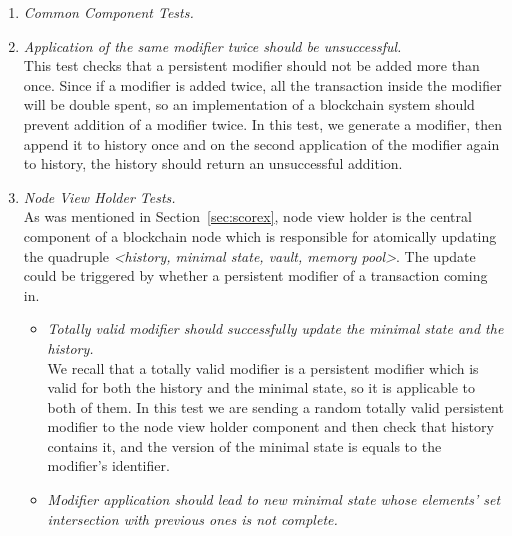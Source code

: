 \begin{enumerate}[\IEEEsetlabelwidth{Z}]
\item \textit{Common Component Tests.}\\

\item \textit{Application of the same modifier twice should be unsuccessful.}\\

This test checks that a persistent modifier should not be added more than once. Since if a modifier is added twice, all the transaction inside the modifier will be double spent, so an implementation of a blockchain system should prevent addition of a modifier twice. In this test, we generate a modifier, then append it to history once and on the second application of the modifier again to history, the history should return an unsuccessful addition.


\item \textit{Node View Holder Tests.}\\

As was mentioned in Section~\ref{sec:scorex}, node view holder is the central component of a blockchain node which is responsible for atomically updating the quadruple \textit{<history, minimal state, vault, memory pool>}. The update could be triggered by whether a persistent modifier of a transaction coming in. 


\begin{itemize}[]

\item \textit{Totally valid modifier should successfully update the minimal state and the history.}\\
We recall that a totally valid modifier is a persistent modifier which is valid for both the history and the minimal state, so it is applicable to both of them. In this test we are sending a random totally valid persistent modifier to the node view holder component and then check that history contains it, and the version of the minimal state is equals to the modifier's identifier.

\item \textit{Modifier application should lead to new minimal state whose elements' set intersection with previous ones is not complete.}\\


\end{itemize}
\end{enumerate}
